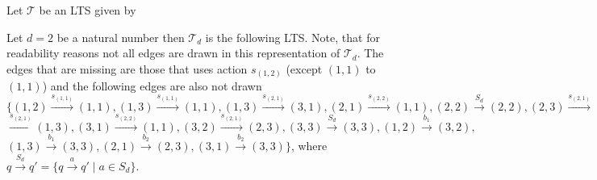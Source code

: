 \begin{example}
    Let $\mathcal{T}$ be an LTS given by
    \begin{center}
    \end{center}
    Let $d = 2$ be a natural number then $\mathcal{T}_d$ is the
    following LTS. Note, that for readability reasons not all edges are drawn in this representation of $\mathcal{T}_d$.
    The edges that are missing are those that uses action $s_{(1, 2)}$ (except $(1, 1)$ to $(1,
    1)$) and the following edges are also not drawn
    $\{(1, 2) \overset{s_{(1, 1)}}{\rightarrow} (1, 1),
    (1, 3) \overset{s_{(1, 1)}}{\rightarrow} (1, 1),
    (1, 3) \overset{s_{(2, 1)}}{\rightarrow} (3, 1),
    (2, 1) \overset{s_{(2, 2)}}{\rightarrow} (1, 1),
    (2, 2) \overset{S_d}{\rightarrow} (2, 2),
    (2, 3) \overset{s_{(2, 1)}}{\rightarrow} (3, 2),
    (3, 1) $ $\overset{s_{(2, 1)}}{\rightarrow} (1, 3),
    (3, 1) \overset{s_{(2, 2)}}{\rightarrow} (1, 1),
    (3, 2) \overset{s_{(2, 1)}}{\rightarrow} (2, 3),
    (3, 3) \overset{S_d}{\rightarrow} (3, 3),
    (1, 2) \overset{b_1}{\rightarrow} (3, 2),
    $ $(1, 3) \overset{b_1}{\rightarrow} (3, 3),
    (2, 1) \overset{b_2}{\rightarrow} (2, 3),
    (3, 1) \overset{b_2}{\rightarrow} (3, 3)
    \}$, where $q \overset{S_d}{\rightarrow} q' =
    \{q \overset{a}{\rightarrow} q' \mid a \in S_d\}$.
    \begin{center}
\end{center}
\end{example}
